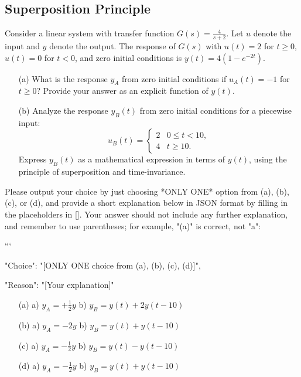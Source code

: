 \documentclass[12pt]{article}
\begin{document}
\subsection{Superposition Principle}

Consider a linear system with transfer function \(G(s) = \frac{4}{s+2}\). Let \(u\) denote the input and \(y\) denote the output. The response of \(G(s)\) with \(u(t) = 2\) for \(t \geq 0\), \(u(t) = 0\) for \(t < 0\), and zero initial conditions is \(y(t) = 4(1 - e^{-2t})\).

\begin{enumerate}
    \item[(a)] What is the response \(y_A\) from zero initial conditions if \(u_A(t) = -1\) for \(t \geq 0\)? Provide your answer as an explicit function of \(y(t)\).
    \item[(b)] Analyze the response \(y_B(t)\) from zero initial conditions for a piecewise input:
    \[ u_B(t) = 
    \begin{cases} 
    2 & 0 \leq t < 10, \\
    4 & t \geq 10.
    \end{cases}
    \]
    Express \(y_B(t)\) as a mathematical expression in terms of \(y(t)\), using the principle of superposition and time-invariance.
\end{enumerate}

Please output your choice by just choosing *ONLY ONE* option from (a), (b), (c), or (d), and provide a short explanation below in JSON format by filling in the placeholders in []. Your answer should not include any further explanation, and remember to use parentheses; for example, "(a)" is correct, not "a":

```
{

"Choice": "[ONLY ONE choice from (a), (b), (c), (d)]",

"Reason": "[Your explanation]"

}
\begin{itemize}
    \item[(a)] a) \(y_A = +\frac{1}{2}y\) b) \(y_B = y(t) + 2 y(t-10)\)
    \item[(b)] a) \(y_A = -2y\) b) \(y_B = y(t) + y(t-10)\)
    \item[(c)] a) \(y_A = -\frac{1}{2}y\) b) \(y_B = y(t) - y(t-10)\)
    \item[(d)] a) \(y_A = -\frac{1}{2}y\) b) \(y_B = y(t) + y(t-10)\)
\end{itemize}
\end{document}
